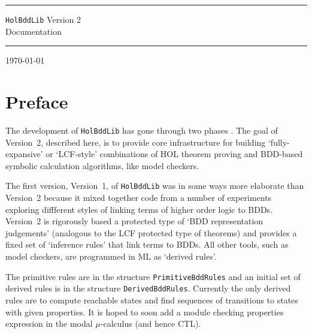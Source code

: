 \documentclass[12pt]{article}
\begin{document}
\thispagestyle{empty}

\hrule height5pt

\begin{flushleft}
{\Huge{\tt HolBddLib} Version 2\\[5mm]
Documentation}
\end{flushleft}

\vspace*{2mm}

\hrule height5pt

\vspace*{1cm}



\vspace*{5mm}

\today

\vfill

{\setlength{\fboxrule}{0.5mm}
\setlength{\fboxsep}{2mm}
}

\vfill

\newpage


\section*{Preface}


The development of {\tt HolBddLib} has gone through two phases
\cite{Gordon:TPHOLs2000}.
The goal of Version~2, described here, is to provide core
infrastructure for building `fully-expansive' or `LCF-style'
combinations of HOL theorem proving and BDD-based symbolic calculation
algorithms, like model checkers.

The first version, Version~1, of {\tt{HolBddLib}} was in some ways more elaborate than Version~2
because it mixed together code from a number of experiments
exploring diffferent styles of linking terms of higher order logic to
BDDs. Version~2 is rigorously based a protected type
of `BDD representation judgements' (analogous to the LCF protected type of theorems)
and provides a fixed set of `inference rules' that link terms to BDDs. All other tools,
such as model checkers, are programmed in ML as `derived rules'.

The primitive rules are in the structure {\tt{PrimitiveBddRules}} and an initial
set of derived rules is in the structure {\tt{DerivedBddRules}}. Currently the only derived rules
are to compute reachable states and find sequences of transitions to states with given properties.
It is hoped to soon add a module checking properties expression
in the modal $\mu$-calculus (and hence CTL).
\end{document}
